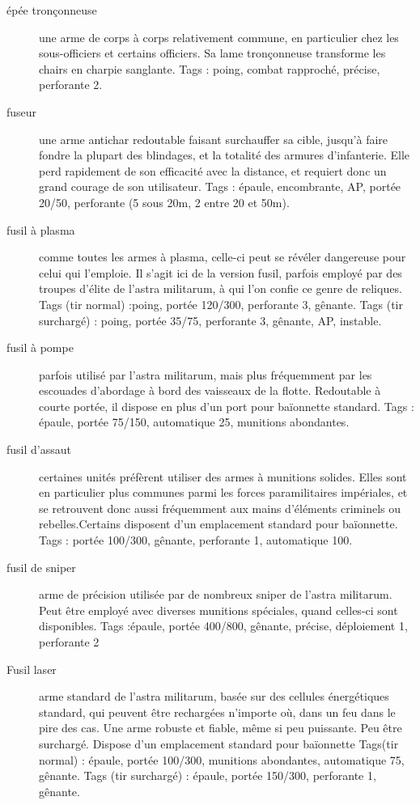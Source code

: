 \documentclass[10pt,a4paper]{article}
\begin{document}
\begin{description}
\item[épée tronçonneuse]une arme de corps à corps relativement commune, en particulier chez les sous-officiers et certains officiers. Sa lame tronçonneuse transforme les chairs en charpie sanglante. Tags : poing, combat rapproché, précise, perforante 2.
\item[fuseur]une arme antichar redoutable faisant surchauffer sa cible, jusqu'à faire fondre la plupart des blindages, et la totalité des armures d'infanterie. Elle perd rapidement de son efficacité avec la distance, et requiert donc un grand courage de son utilisateur. Tags : épaule, encombrante, AP, portée 20/50, perforante (5 sous 20m, 2 entre 20 et 50m).
\item[fusil à plasma]comme toutes les armes à plasma, celle-ci peut se révéler dangereuse pour celui qui l'emploie. Il s'agit ici de la version fusil, parfois employé par des troupes d'élite de l'astra militarum, à qui l'on confie ce genre de reliques. Tags (tir normal) :poing, portée 120/300, perforante 3, gênante. Tags (tir surchargé) : poing, portée 35/75, perforante 3, gênante, AP, instable.
\item[fusil à pompe]parfois utilisé par l'astra militarum, mais plus fréquemment par les escouades d'abordage à bord des vaisseaux de la flotte. Redoutable à courte portée, il dispose en plus d'un port pour baïonnette standard. Tags : épaule, portée 75/150, automatique 25, munitions abondantes.
\item[fusil d'assaut ]certaines unités préfèrent utiliser des armes à munitions solides. Elles sont en particulier plus communes parmi les forces paramilitaires impériales, et se retrouvent donc aussi fréquemment aux mains d'éléments criminels ou rebelles.Certains disposent d'un emplacement standard pour baïonnette. Tags : portée 100/300, gênante, perforante 1, automatique 100.
\item[fusil de sniper] arme de précision utilisée par de nombreux sniper de l'astra militarum. Peut être employé avec diverses munitions spéciales, quand celles-ci sont disponibles. Tags :épaule, portée 400/800, gênante, précise, déploiement 1, perforante 2
\item[Fusil laser]arme standard de l'astra militarum, basée sur des cellules énergétiques standard, qui peuvent être rechargées n'importe où, dans un feu dans le pire des cas. Une arme robuste et fiable, même si peu puissante. Peu être surchargé. Dispose d'un emplacement standard pour baïonnette Tags(tir normal) : épaule, portée 100/300, munitions abondantes, automatique 75, gênante. Tags (tir surchargé) : épaule, portée 150/300, perforante 1, gênante.

\end{description}
\end{document}
